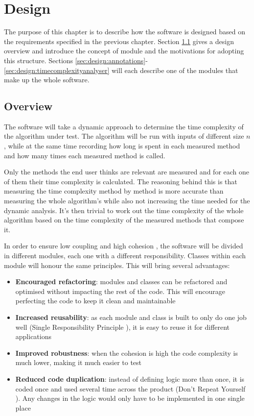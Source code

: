 \chapter{Design}

The purpose of this chapter is to describe how the software is designed based on the requirements specified in the previous chapter. Section \ref{sec:design:overview} gives a design overview and introduce the concept of module and the motivations for adopting this structure. Sections \ref{sec:design:annotations}-\ref{sec:design:timecomplexityanalyser} will each describe one of the modules that make up the whole software.


\section{Overview}
\label{sec:design:overview}
The software will take a dynamic approach to determine the time complexity of the algorithm under test. The algorithm will be run with inputs of different size $n$, while at the same time recording how long is spent in each measured method and how many times each measured method is called.

\noindent Only the methods the end user thinks are relevant are measured and for each one of them their time complexity is calculated. The reasoning behind this is that measuring the time complexity method by method is more accurate than measuring the whole algorithm's while also not increasing the time needed for the dynamic analysis. It's then trivial to work out the time complexity of the whole algorithm based on the time complexity of the measured methods that compose it.

\noindent In order to ensure low coupling and high cohesion \cite{EYC79}, the software will be divided in different modules, each one with a different responsibility. Classes within each module will honour the same principles. This will bring several advantages:
\begin{itemize}
  \item \textbf{Encouraged refactoring}: modules and classes can be refactored and optimised without impacting the rest of the code. This will encourage perfecting the code to keep it clean and maintainable
  \item \textbf{Increased reusability}: as each module and class is built to only do one job well (Single Responsibility Principle \cite{RCM03}), it is easy to reuse it for different applications
  \item \textbf{Improved robustness}: when the cohesion is high the code complexity is much lower, making it much easier to test
  \item \textbf{Reduced code duplication}: instead of defining logic more than once, it is coded once and used several time across the product (Don't Repeat Yourself \cite{AHT99}). Any changes in the logic would only have to be implemented in one single place
\end{itemize}

